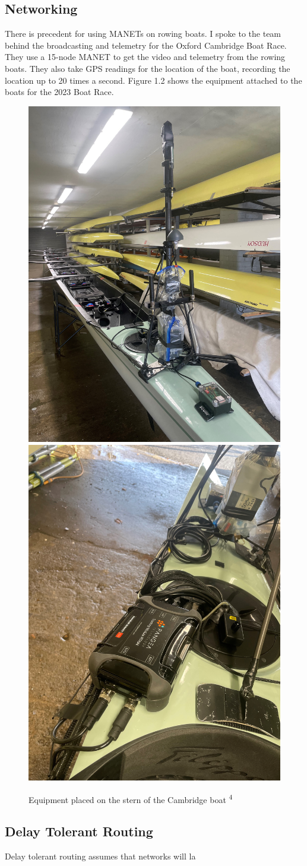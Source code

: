 \documentclass[12pt,a4paper]{report}
\begin{document}
\subsection{Networking}
There is precedent for using MANETs on rowing boats. I spoke to the team behind the broadcasting and telemetry for the Oxford Cambridge Boat Race. They use a 15-node MANET to get the video and telemetry from the rowing boats. They also take GPS readings for the location of the boat, recording the location up to 20 times a second. Figure 1.2 shows the equipment attached to the boats for the 2023 Boat Race.  
\begin{figure}[h]
\begin{center}
\includegraphics[scale=0.07]{boatrace1.jpg}           \includegraphics[scale=0.07]{boatrace2.jpg}
\end{center}
\caption{Equipment placed on the stern of the Cambridge boat \textsuperscript{4} }
\end{figure}


\subsection{Delay Tolerant Routing}
Delay tolerant routing assumes that networks will la
\end{document}

